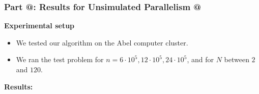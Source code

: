 \documentclass[9pt]{beamer}
\makeatletter
\newcommand*{\rom}[1]{\expandafter\@slowromancap\romannumeral #1@}
\makeatother
\begin{document}
\begin{frame}
\frametitle{\textbf{ Part \rom{5}:} Results for Unsimulated Parallelism \rom{1}}
\textbf{Experimental setup}
\begin{itemize}
\item{We tested our algorithm on the Abel computer cluster.}
\item{We ran the test problem for $n=6\cdot 10^5,12\cdot 10^5,24\cdot 10^5$, and for $N$ between $2$ and $120$.}
\end{itemize}
\textbf{Results:}
\begin{columns}
\end{columns}
\end{frame}
\end{document}
